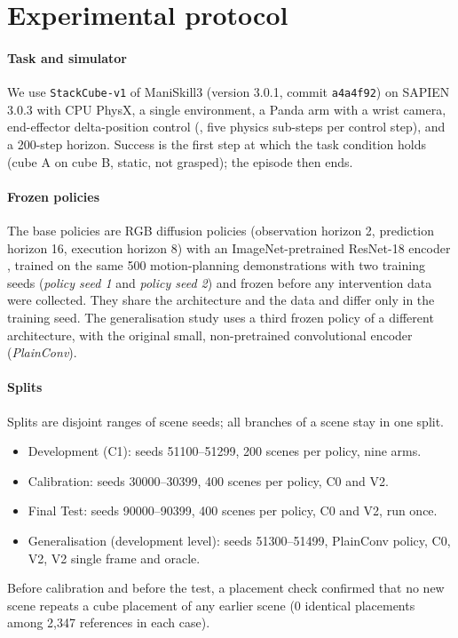 \section{Experimental protocol}\label{sec:protocol}

\paragraph{Task and simulator} We use \texttt{StackCube-v1} of ManiSkill3 \cite{tao2024maniskill3} (version 3.0.1, commit \texttt{a4a4f92}) on SAPIEN 3.0.3 \cite{xiang2020sapien} with CPU PhysX, a single environment, a Panda arm with a wrist camera, end-effector delta-position control (, five physics sub-steps per control step), and a 200-step horizon. Success is the first step at which the task condition holds (cube A on cube B, static, not grasped); the episode then ends.

\paragraph{Frozen policies} The base policies are RGB diffusion policies \cite{chi2023diffusion} (observation horizon 2, prediction horizon 16, execution horizon 8) with an ImageNet-pretrained ResNet-18 encoder \cite{he2016resnet}, trained on the same 500 motion-planning demonstrations with two training seeds (\emph{policy seed 1} and \emph{policy seed 2}) and frozen before any intervention data were collected. They share the architecture and the data and differ only in the training seed. The generalisation study uses a third frozen policy of a different architecture, with the original small, non-pretrained convolutional encoder (\emph{PlainConv}).

\paragraph{Splits} Splits are disjoint ranges of scene seeds; all branches of a scene stay in one split.
\begin{itemize}
\item Development (C1): seeds 51100--51299, 200 scenes per policy, nine arms.
\item Calibration: seeds 30000--30399, 400 scenes per policy, C0 and V2.
\item Final Test: seeds 90000--90399, 400 scenes per policy, C0 and V2, run once.
\item Generalisation (development level): seeds 51300--51499, PlainConv policy, C0, V2, V2 single frame and oracle.
\end{itemize}
Before calibration and before the test, a placement check confirmed that no new scene repeats a cube placement of any earlier scene (0 identical placements among 2,347 references in each case).

